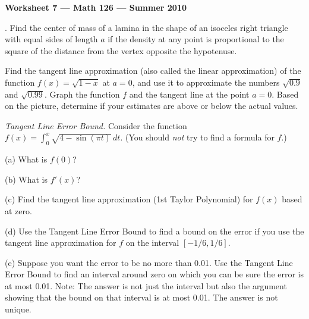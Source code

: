 \documentclass[12pt]{article}
\begin{document}
\begin{center}
\bf{Worksheet 7 --- Math 126 --- Summer 2010}
\end{center}


\vspace{0.2in}
.  
Find the center of mass of a lamina in the shape of an isoceles right triangle with equal sides of length $a$ if the density at any point is proportional to the square of the distance from the vertex opposite the hypotenuse.

\vspace{0.2in}
Find the tangent line approximation (also called the linear approximation)
of the function $f(x) = \sqrt{1-x}$ at $a=0$, 
and use it to approximate the numbers $\sqrt{0.9}$ and $\sqrt{0.99}$.
Graph the function $f$ and the tangent line at the point $a=0$. 
Based on the picture,
determine if your estimates are above or below the actual values.

\vspace{0.2in}
\noindent
[3] \emph{Tangent Line Error Bound.}
Consider the function $\displaystyle f(x) = \int_0^x \sqrt{4-\sin(\pi t)} \, dt$.
(You should \emph{not} try to find a formula for $f$.)

(a) What is $f(0)$?   

(b) What is $f'(x)$?

(c)  Find the tangent line approximation (1st Taylor Polynomial)
     for $f(x)$ based at zero.

(d)  Use the Tangent Line Error Bound to find a bound on the error
    if you use the tangent line approximation for $f$ on the interval
    $[-1/6,1/6]$. 

(e)  Suppose you want the error to be no more than 0.01.  
     Use the Tangent Line Error Bound to find an interval around zero
     on which you can be sure the error is at most 0.01.
     Note:  The answer is not just the interval but also the argument
     showing that the bound on that interval is at most 0.01.
     The answer is not unique.
\end{document}
